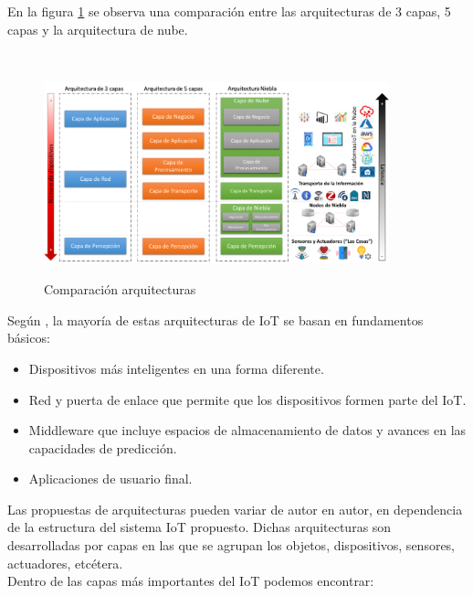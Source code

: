     En la figura \ref{imag:comparacionArquitecturas} se observa una comparación entre las arquitecturas de 3 capas, 5 capas y la arquitectura de nube.\\\\

    \begin{figure}[h]
        \centering
        \includegraphics[width=10cm, height=6cm]{imagenes/Comparacion-arquitecturas-1024x535}
        \caption{Comparación arquitecturas}
        \label{imag:comparacionArquitecturas}
    \end{figure}

    Según \cite{capasIoTciberseguridad}, la mayoría de estas arquitecturas de IoT se basan en fundamentos básicos:
    \begin{itemize}
        \item Dispositivos más inteligentes en una forma diferente.
        \item Red y puerta de enlace que permite que los dispositivos formen parte del IoT.
        \item Middleware que incluye espacios de almacenamiento de datos y avances en las capacidades de predicción.
        \item Aplicaciones de usuario final.\\
    \end{itemize}

    Las propuestas de arquitecturas pueden variar de autor en autor, en dependencia de la estructura del sistema IoT propuesto. Dichas arquitecturas son desarrolladas por capas en las que se agrupan los objetos, dispositivos, sensores, actuadores, etcétera.\\

    Dentro de las capas más importantes del IoT podemos encontrar:

